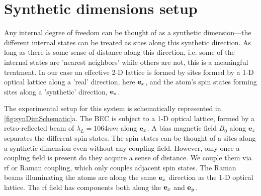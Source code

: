 %	

\section{Synthetic dimensions setup}

Any internal degree of freedom can be thought of as a synthetic dimension---the different internal states can be treated as sites along this synthetic direction. As long as there is some sense of distance along this direction, i.e. some of the internal states are 'nearest neighbors' while others are not, this is a meaningful treatment. In our case an effective 2-D lattice is formed by sites formed by a 1-D optical lattice along a 'real' direction, here  ${\bf e}_x$, and the atom's spin states forming sites along a 'synthetic' direction,  ${\bf e}_s$. 

The experimental setup for this system is schematically represented in \ref{fig:synDimSchematic}a. The BEC is subject to a 1-D optical lattice, formed by a retro-reflected beam of $\lambda_L=1064 nm$ along  ${\bf e}_x$. A bias magnetic field $B_0$ along  ${\bf e}_z$ separates the different spin states. The spin states can be thought of a sites along a synthetic dimension even without any coupling field. However, only once a coupling field is present do they acquire a sense of distance. We couple them via rf or Raman coupling, which only couples adjacent spin states. The Raman beams illuminating the atoms are along the same  ${\bf e}_x$ direction as the 1-D optical lattice. The rf field has components both along the  ${\bf e}_x$ and  ${\bf e}_y$. 


